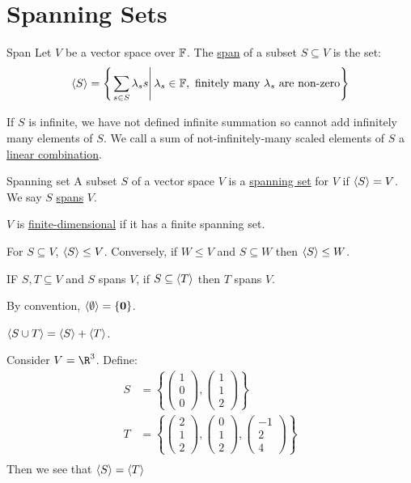 \documentclass[../Main.tex]{subfiles}
\begin{document}
\section{Spanning Sets}
\begin{definition}{Span}
    Let $V$ be a vector space over $\mathbb{F}$. The \underline{span} of a subset $S \subseteq V$ is the set:
    \begin{equation*}
        \langle S \rangle = \left\{\left.\sum_{s \in S} \lambda_s s \right| \lambda_s \in \mathbb{F}, \text{ finitely many } \lambda _s \text{ are non-zero} \right\}
    \end{equation*}
\end{definition}
\begin{remark}
    If $S$ is infinite, we have not defined infinite summation so cannot add infinitely many elements of $S$. We call a sum of not-infinitely-many scaled elements of $S$ a \underline{linear combination}.
\end{remark}
\begin{definition}{Spanning set}
    A subset $S$ of a vector space $V$ is a \underline{spanning set} for $V$ if $\langle S \rangle = V$. We say $S$ \underline{spans} $V$.
\end{definition}
$V$ is \underline{finite-dimensional} if it has a finite spanning set.
\begin{remarks}
    \item For $S \subseteq V$, $\langle S \rangle \leq V$. Conversely, if $W \leq V$ and $S \subseteq W$ then $\langle S \rangle \leq W$.
    \item IF $S, T \subseteq V$ and $S$ spans $V$, if $S \subseteq \langle T \rangle$ then $T$ spans $V$.
    \item By convention, $\langle \emptyset \rangle = \{\boldsymbol{0}\}$.
    \item $\langle S \cup T \rangle = \langle S \rangle + \langle T \rangle$.
\end{remarks}
\begin{example}
    Consider $V = \R^3$. Define:
    \begin{align*}
        S &= \left\{\begin{pmatrix} 1 \\ 0 \\ 0\end{pmatrix}, \begin{pmatrix}1 \\ 1 \\ 2\end{pmatrix}\right\} \\
        T &= \left\{\begin{pmatrix} 2 \\ 1 \\ 2\end{pmatrix}, \begin{pmatrix}0 \\ 1 \\ 2\end{pmatrix}, \begin{pmatrix}-1 \\ 2 \\ 4\end{pmatrix}\right\} \\
    \end{align*}
    Then we see that $\langle S \rangle = \langle T \rangle$
    \label{ex3DSpanningSets}
\end{example}
\end{document}
